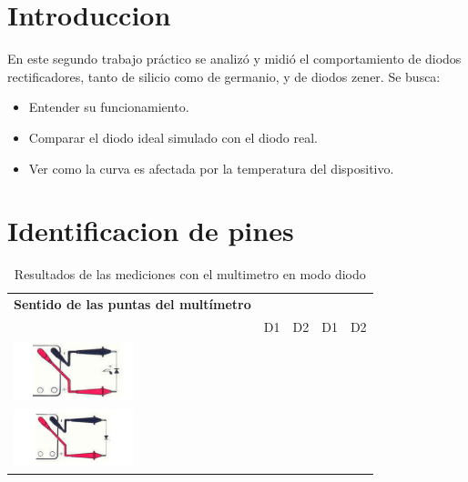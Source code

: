 \documentclass[chaptersright]{informeutn}
\begin{document}
\maketitle
\tableofcontents

\chapter{Introduccion}

  En este segundo trabajo práctico se analizó y midió el comportamiento de diodos rectificadores, tanto de silicio como 
  de germanio, y de diodos zener. Se busca:
  
  \begin{itemize}
    \item Entender su funcionamiento.
    \item Comparar el diodo ideal simulado con el diodo real.
    \item Ver como la curva es afectada por la temperatura del dispositivo.
  \end{itemize}


\chapter{Identificacion de pines}

  \begin{center}
  \begin{table}[h!]
  \centering
  \renewcommand{\arraystretch}{2}
  \begin{tabular}{|m{4cm}|>{\centering}m{2cm}|>{\centering}m{2cm}|>{\centering}m{2cm}|>{\centering\arraybackslash}m{2cm}|}
  \hline
  \textbf{Sentido de las puntas del multímetro} & \multicolumn{2}{c|}{\textbf{Diodo de silicio}} & \multicolumn{2}{c|}{\textbf{Diodo de germanio}} \\
  \cline{2-5}
  & D1 & D2 & D1 & D2 \\
  \hline
  \includegraphics[width=3.5cm]{pictures/polaridad_multimetro1.png} &  &  &  &  \\
  \hline
  \includegraphics[width=3.5cm]{pictures/polaridad_multimetro2.png} &  &  &  &  \\
  \hline
  \end{tabular}
  \caption{Resultados de las mediciones con el multimetro en modo diodo}
  \end{table}
  \end{center}
\end{document}
